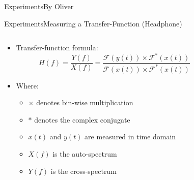 \begin{frame}{Experiments}{By Oliver}
\begin{frame}{Experiments}{Measuring a Transfer-Function (Headphone)}		
	\begin{columns}
		\begin{column}{0.5\textwidth}
			\begin{itemize}
				\item Transfer-function formula:
				\begin{equation*}
				H(f)=\frac{Y(f)}{X(f)}=\frac{\mathscr{F}(y(t))\times\mathscr{F}^{\ast}(x(t))}{\mathscr{F}(x(t))\times\mathscr{F}^{\ast}(x(t))}
				\end{equation*}
				\item Where:
				\begin{itemize}
					\item[] $\times$ denotes bin-wise multiplication
					\item[] $\ast$ denotes the complex conjugate
					\item[] $x(t)$ and $y(t)$ are measured in time domain
					\item[] $X(f)$ is the auto-spectrum
					\item[] $Y (f)$ is the cross-spectrum
				\end{itemize}
			\end{itemize}
		\end{column}
		\begin{column}{0.5\textwidth} 



		\end{column}
	\end{columns}
\end{frame}


\end{frame}
